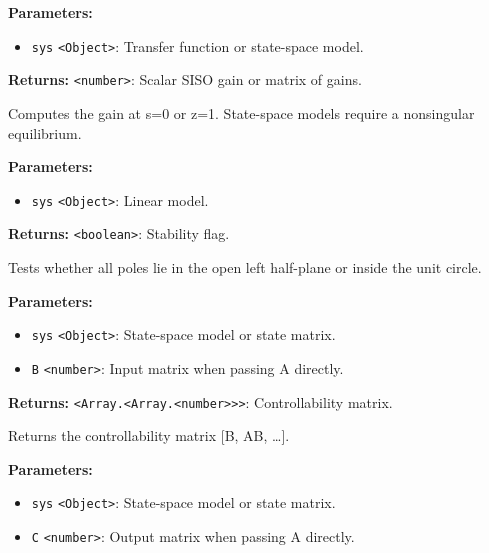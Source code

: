 \documentclass[12pt,a4paper]{article}
\begin{document}
\noindent \textbf{Parameters:}
\begin{itemize}
  \item \texttt{sys} \texttt{<Object>}: Transfer function or state-space model.
\end{itemize}

\noindent \textbf{Returns:} \texttt{<number>}: Scalar SISO gain or matrix of gains.

\noindent Computes the gain at s=0 or z=1. State-space models require a nonsingular equilibrium.

\vspace{5mm}
\noindent {}


\noindent \textbf{Parameters:}
\begin{itemize}
  \item \texttt{sys} \texttt{<Object>}: Linear model.
\end{itemize}

\noindent \textbf{Returns:} \texttt{<boolean>}: Stability flag.

\noindent Tests whether all poles lie in the open left half-plane or inside the unit circle.

\vspace{5mm}
\noindent {}


\noindent \textbf{Parameters:}
\begin{itemize}
  \item \texttt{sys} \texttt{<Object>}: State-space model or state matrix.
  \item \texttt{B} \texttt{<number>}: Input matrix when passing A directly.
\end{itemize}

\noindent \textbf{Returns:} \texttt{<Array.<Array.<number>>>}: Controllability matrix.

\noindent Returns the controllability matrix [B, AB, …].

\vspace{5mm}
\noindent {}


\noindent \textbf{Parameters:}
\begin{itemize}
  \item \texttt{sys} \texttt{<Object>}: State-space model or state matrix.
  \item \texttt{C} \texttt{<number>}: Output matrix when passing A directly.
\end{itemize}
\end{document}
